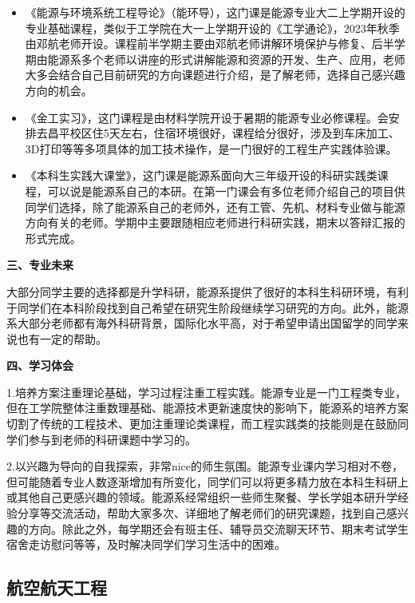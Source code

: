 \documentclass[11pt,oneside]{book}
\begin{document}
\begin{itemize}
	\item 《能源与环境系统工程导论》（能环导），这门课是能源专业大二上学期开设的专业基础课程，类似于工学院在大一上学期开设的《工学通论》，2023年秋季由邓航老师开设。课程前半学期主要由邓航老师讲解环境保护与修复、后半学期由能源系多个老师以讲座的形式讲解能源和资源的开发、生产、应用，老师大多会结合自己目前研究的方向课题进行介绍，是了解老师，选择自己感兴趣方向的机会。
	
	\item 《金工实习》，这门课程是由材料学院开设于暑期的能源专业必修课程。会安排去昌平校区住5天左右，住宿环境很好，课程给分很好，涉及到车床加工、3D打印等等多项具体的加工技术操作，是一门很好的工程生产实践体验课。
	
	\item 《本科生实践大课堂》，这门课是能源系面向大三年级开设的科研实践类课程，可以说是能源系自己的本研。在第一门课会有多位老师介绍自己的项目供同学们选择，除了能源系自己的老师外，还有工管、先机、材料专业做与能源方向有关的老师。学期中主要跟随相应老师进行科研实践，期末以答辩汇报的形式完成。
	
\end{itemize}

\textbf{三、专业未来}

大部分同学主要的选择都是升学科研，能源系提供了很好的本科生科研环境，有利于同学们在本科阶段找到自己希望在研究生阶段继续学习研究的方向。此外，能源系大部分老师都有海外科研背景，国际化水平高，对于希望申请出国留学的同学来说也有一定的帮助。

\vspace{10pt}

\textbf{四、学习体会}

1.培养方案注重理论基础，学习过程注重工程实践。能源专业是一门工程类专业，但在工学院整体注重数理基础、能源技术更新速度快的影响下，能源系的培养方案切割了传统的工程技术、更加注重理论类课程，而工程实践类的技能则是在鼓励同学们参与到老师的科研课题中学习的。

\vspace{10pt}

2.以兴趣为导向的自我探索，非常nice的师生氛围。能源专业课内学习相对不卷，但可能随着专业人数逐渐增加有所变化，同学们可以将更多精力放在本科生科研上或其他自己更感兴趣的领域。能源系经常组织一些师生聚餐、学长学姐本研升学经验分享等交流活动，帮助大家多次、详细地了解老师们的研究课题，找到自己感兴趣的方向。除此之外，每学期还会有班主任、辅导员交流聊天环节、期末考试学生宿舍走访慰问等等，及时解决同学们学习生活中的困难。

\subsection{航空航天工程}
\end{document}
